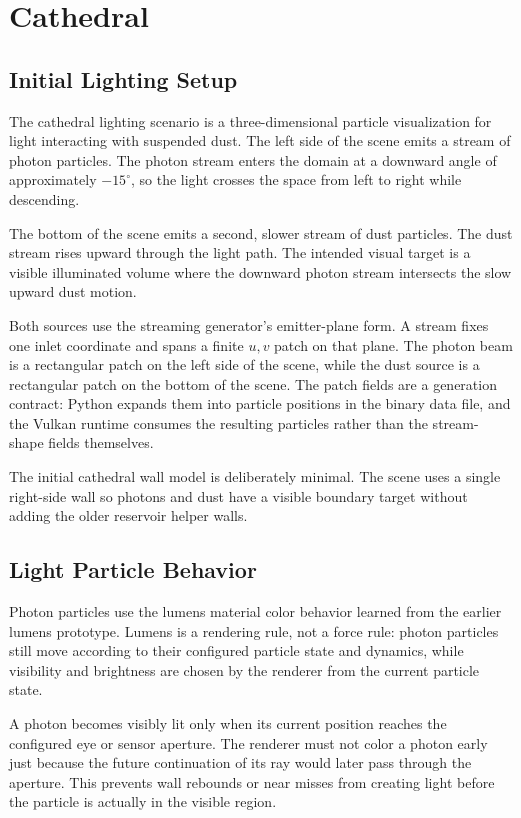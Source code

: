 \newpage
\section{Cathedral}

\subsection{Initial Lighting Setup}

The cathedral lighting scenario is a three-dimensional particle visualization
for light interacting with suspended dust.  The left side of the scene emits a
stream of photon particles.  The photon stream enters the domain at a downward
angle of approximately \(-15^\circ\), so the light crosses the space from left
to right while descending.

The bottom of the scene emits a second, slower stream of dust particles.  The
dust stream rises upward through the light path.  The intended visual target is
a visible illuminated volume where the downward photon stream intersects the
slow upward dust motion.

Both sources use the streaming generator's emitter-plane form.  A stream fixes
one inlet coordinate and spans a finite \(u,v\) patch on that plane.  The photon
beam is a rectangular patch on the left side of the scene, while the dust source
is a rectangular patch on the bottom of the scene.  The patch fields are a
generation contract: Python expands them into particle positions in the binary
data file, and the Vulkan runtime consumes the resulting particles rather than
the stream-shape fields themselves.

The initial cathedral wall model is deliberately minimal.  The scene uses a
single right-side wall so photons and dust have a visible boundary target
without adding the older reservoir helper walls.

\subsection{Light Particle Behavior}

Photon particles use the lumens material color behavior learned from the
earlier lumens prototype.  Lumens is a rendering rule, not a force rule:
photon particles still move according to their configured particle state and
dynamics, while visibility and brightness are chosen by the renderer from the
current particle state.

A photon becomes visibly lit only when its current position reaches the
configured eye or sensor aperture.  The renderer must not color a photon early
just because the future continuation of its ray would later pass through the
aperture.  This prevents wall rebounds or near misses from creating light
before the particle is actually in the visible region.

